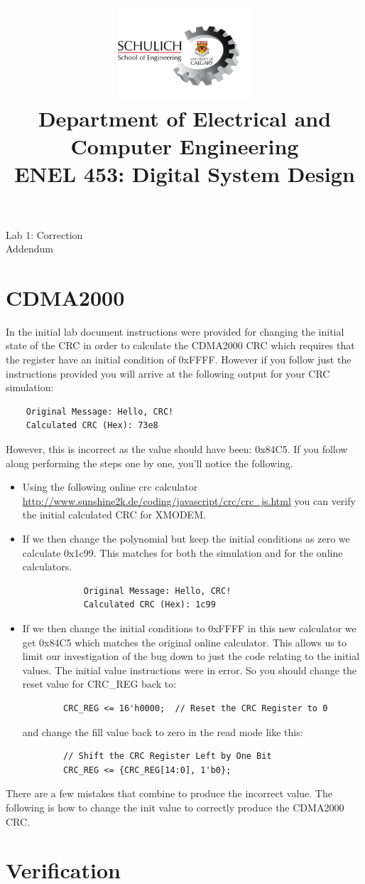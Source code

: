 \documentclass{article}
\title{
  \includegraphics[width=5cm]{Images/Logo.png}\\
  \normalsize Department of Electrical and Computer Engineering\\
  ENEL 453: Digital System Design
}
\date{\semester}
\makeatletter
\renewcommand{\maketitle}{%
  \begin{center}
    {\@title}
    \vspace{1cm} %
    {\@date}
  \end{center}
}
\makeatother
\begin{document}
\centering

\maketitle
\large Lab 1: Correction \\
\large Addendum 

\RaggedRight
\section{CDMA2000}
In the initial lab document instructions were provided for changing the initial state of the CRC in order to calculate the CDMA2000 CRC which requires that the register have an initial condition of 0xFFFF. However if you follow just the instructions provided you will arrive at the following output for your CRC simulation:
\begin{verbatim}
    Original Message: Hello, CRC!
    Calculated CRC (Hex): 73e8
\end{verbatim}
However, this is incorrect as the value should have been: 0x84C5. If you follow along performing the steps one by one, you'll notice the following. 

\begin{itemize}
    \item Using the following online crc calculator \url{http://www.sunshine2k.de/coding/javascript/crc/crc_js.html} you can verify the initial calculated CRC for XMODEM. 
    \item If we then change the polynomial but keep the initial conditions as zero we calculate 0x1c99. This matches for both the simulation and for the online calculators. 
        \begin{verbatim}
            Original Message: Hello, CRC!
            Calculated CRC (Hex): 1c99
        \end{verbatim}  
    \item If we then change the initial conditions to 0xFFFF in this new calculator we get 0x84C5 which matches the original online calculator. This allows us to limit our investigation of the bug down to just the code relating to the initial values. The initial value instructions were in error. So you should change the reset value for CRC\_REG back to:
    \begin{verbatim}
        CRC_REG <= 16'h0000;  // Reset the CRC Register to 0
    \end{verbatim}
    and change the fill value back to zero in the read mode like this:
    \begin{verbatim}
        // Shift the CRC Register Left by One Bit
        CRC_REG <= {CRC_REG[14:0], 1'b0}; 
    \end{verbatim}
\end{itemize}

There are a few mistakes that combine to produce the incorrect value. The following is how to change the init value to correctly produce the CDMA2000 CRC.



\section{Verification}

\end{document}
